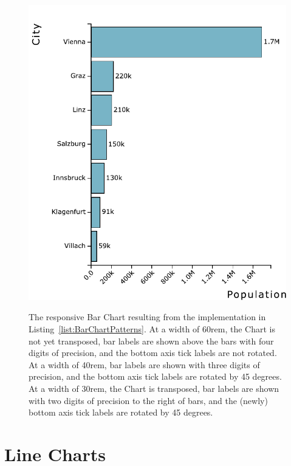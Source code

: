 \begin{figure}[tp]
{  \includegraphics[valign=b,scale=\respscale]{diagrams/respvis-bar-30rem.pdf}%
  \label{fig:BarChartPatterns30rem}%
}
\caption[Responsive RespVis Bar Chart]{%
The responsive Bar Chart resulting from the implementation in
Listing~\ref{list:BarChartPatterns}.
 At a width of 60rem, the
Chart is not yet transposed, bar labels are shown above the bars with
four digits of precision, and the bottom axis tick labels are not
rotated.  At a width of
40rem, bar labels are shown with three digits of precision, and the
bottom axis tick labels are rotated by 45 degrees.
 At a width of 30rem, the
Chart is transposed, bar labels are shown with two digits of precision
to the right of bars, and the (newly) bottom axis tick labels are
rotated by 45 degrees.
}
\label{fig:BarChartPatterns}
\end{figure}









\section{Line Charts}
\label{sec:LineChartsUsage}

